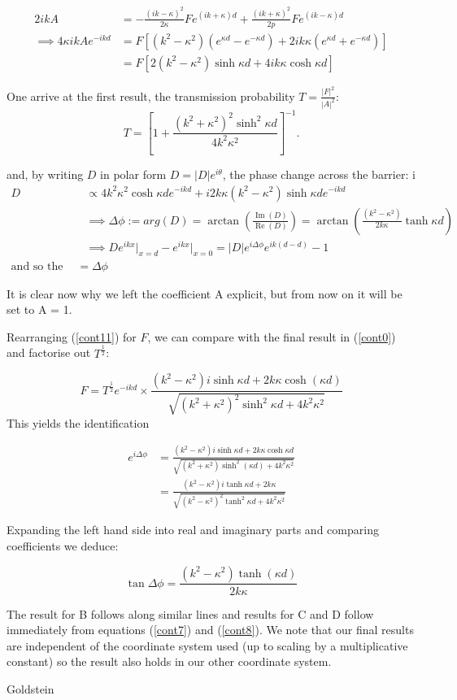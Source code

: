 \documentclass{article}
\begin{document}
\begin{align}
	2ikA &= -\frac{(ik-\kappa)^2}{2\kappa}Fe^{(ik+\kappa)d}+\frac{(ik+\kappa)^2}{2p}Fe^{(ik-\kappa)d} \\
	\implies 4\kappa ikAe^{-ikd} &= F[(k^2-\kappa^2)(e^{\kappa d}-e^{-\kappa d})+2ik\kappa(e^{\kappa d}+e^{-\kappa d})] \\
				     &= F[2(k^2-\kappa^2)\sinh{\kappa d}+4ik\kappa \cosh{\kappa d}] 
\end{align}

One arrive at the first result, the transmission probability $T = \frac{|F|^2}{|A|^2}$:
\[
	T = [1+\frac{(k^2+\kappa^2)^2\sinh^2{\kappa d}}{4k^2\kappa^2}]^{-1}
.\] 

and, by writing $D$ in polar form $D = |D|e^{i\theta}$, the phase change across the barrier:
i
\begin{align}
	D &\propto 4k^2\kappa^2 \cosh{\kappa d}e^{-ikd}+i2k\kappa(k^2-\kappa^2)\sinh{\kappa d}e^{-ikd} \\
	  &\implies \Delta \phi := arg(D) = \arctan\left(\frac{\operatorname{Im}(D)}{\operatorname{Re}(D)}\right) = \arctan\left(\frac{(k^2-\kappa^2)}{2k\kappa}\tanh{\kappa d}\right) \\
	  &\implies De^{ikx}\rvert_{x=d}-e^{ikx}\rvert_{x=0} = |D|e^{i\Delta \phi}e^{ik(d-d)}-1 \\
	  \text{and so the phase change} = \Delta \phi
\end{align}

It is clear now why we left the coefficient A explicit, but from now on it will be set to A = 1.

Rearranging (\ref{cont11}) for $F$, we can compare with the final result in (\ref{cont0}) and factorise out $T^\frac{1}{2}$:

\[
	F = T^{\frac{1}{2}}e^{-ikd} \times \frac{(k^2-\kappa^2)i\sinh{\kappa d}+2k\kappa \cosh(\kappa d)}{\sqrt{(k^2+\kappa^2)^2\sinh^{2}{\kappa d}+4k^2\kappa^2}}
\] 
This yields the identification

\begin{align}
	e^{i\Delta\phi} &= \frac{(k^2-\kappa^2)i\sinh{\kappa d}+2k\kappa \cosh{\kappa d}}{\sqrt{(k^2+\kappa^2)\sinh^{2}(\kappa d)+4k^2\kappa^2}} \\
			&= \frac{(k^2-\kappa^2)i\tanh{\kappa d}+2k\kappa}{\sqrt{(k^2-\kappa^2)^2\tanh^2{\kappa d}+4k^2\kappa^2}}
\end{align}

Expanding the left hand side into real and imaginary parts and comparing coefficients we deduce:

\[
	\tan{\Delta\phi} = \frac{(k^2-\kappa^2)\tanh(\kappa d)}{2k\kappa}
\] 

The result for B follows along similar lines and results for C and D follow immediately from equations (\ref{cont7}) and (\ref{cont8}). We note that our final results are independent of the coordinate system used (up to scaling by a multiplicative constant) so the result also holds in our other coordinate system.

\begin{thebibliography}{100}
Goldstein

\end{thebibliography}
\end{document}
